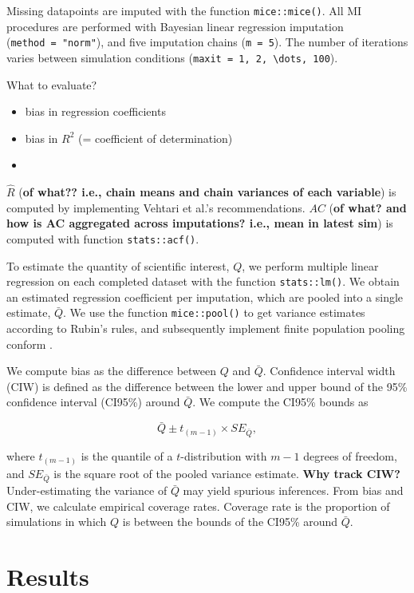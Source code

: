 \documentclass[Royal,times,sageh]{sagej}
\begin{document}
Missing datapoints are imputed with the function \texttt{mice::mice()}.
All MI procedures are performed with Bayesian linear regression
imputation (\texttt{method\ =\ "norm"}), and five imputation chains
(\texttt{m\ =\ 5}). The number of iterations varies between simulation
conditions (\texttt{maxit\ =\ 1,\ 2,\ \textbackslash{}dots,\ 100}).

What to evaluate?

\begin{itemize}
\item
  bias in regression coefficients
\item
  bias in \(R^2\) (= coefficient of determination)
\item
\end{itemize}

\(\widehat{R}\) (\textbf{of what?? i.e., chain means and chain variances
of each variable}) is computed by implementing Vehtari et al.'s
\citeyearpar{veht19} recommendations. \(AC\) (\textbf{of what? and how
is AC aggregated across imputations? i.e., mean in latest sim}) is
computed with function \texttt{stats::acf()}.

To estimate the quantity of scientific interest, \(Q\), we perform
multiple linear regression on each completed dataset with the function
\texttt{stats::lm()}. We obtain an estimated regression coefficient per
imputation, which are pooled into a single estimate, \(\bar{Q}\). We use
the function \texttt{mice::pool()} to get variance estimates according
to Rubin's \citeyearpar{rubin87} rules, and subsequently implement
finite population pooling conform \citet{vink14}.

We compute bias as the difference between \(Q\) and \(\bar{Q}\).
Confidence interval width (CIW) is defined as the difference between the
lower and upper bound of the 95\% confidence interval (CI95\%) around
\(\bar{Q}\). We compute the CI95\% bounds as

\[\bar{Q} \pm t_{(m-1)} \times SE_{\bar{Q}},\]

where \(t_{(m-1)}\) is the quantile of a \(t\)-distribution with \(m-1\)
degrees of freedom, and \(SE_{\bar{Q}}\) is the square root of the
pooled variance estimate. \textbf{Why track CIW?} Under-estimating the
variance of \(\bar{Q}\) may yield spurious inferences. From bias and
CIW, we calculate empirical coverage rates. Coverage rate is the
proportion of simulations in which \(Q\) is between the bounds of the
CI95\% around \(\bar{Q}\).

\hypertarget{results}{%
\section{Results}\label{results}}
\end{document}
